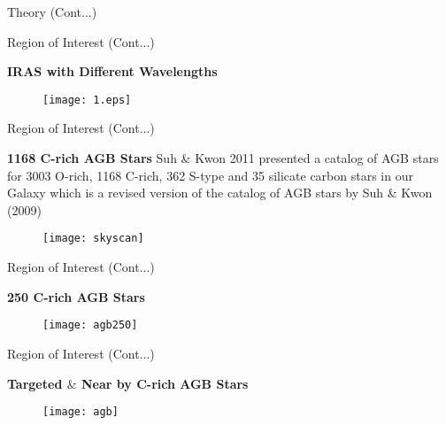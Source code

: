 \documentclass[12pt,a4paper]{beamer}
\begin{document}
\begin{frame}{Theory (Cont...)}
\begin{frame}{Region of Interest (Cont...)}
\begin{block}{\centering\textbf{IRAS with Different Wavelengths \vspace*{.5cm}}}
\begin{figure}[h]
\vspace{0.0cm} \centering
\texttt{[image: 1.eps]}
\end{figure}
\end{block}
\end{frame}



\begin{frame}{Region of Interest (Cont...)}
\begin{block}{\centering\textbf{1168 C-rich AGB Stars \vspace*{.5cm}}}
 Suh \& Kwon 2011 presented a catalog of AGB stars for 3003 O-rich, 1168 C-rich, 362 S-type and 35 silicate carbon stars in our Galaxy which is a revised version of the catalog of AGB stars by Suh \& Kwon (2009)
\begin{figure}[h]
\vspace{0.0cm} \centering
\texttt{[image: skyscan]}
\end{figure}
\end{block}
\end{frame}



\begin{frame}{Region of Interest (Cont...)}
\begin{block}{\centering\textbf{250 C-rich AGB Stars \vspace*{.5cm}}}
\begin{itemize}
\begin{figure}[h]
\vspace{0.0cm} \centering
\texttt{[image: agb250]}
\end{figure}
\end{itemize}
\end{block}
\end{frame}

\begin{frame}{Region of Interest (Cont...)}
\begin{block}{\centering\textbf{Targeted $\&$ Near by  C-rich AGB Stars \vspace*{.5cm}}}
\begin{itemize}
\begin{figure}[h]
\vspace{0.0cm} \centering
\texttt{[image: agb]}
\end{figure}
\end{itemize}
\end{block}
\end{frame}


\end{frame}
\end{document}
